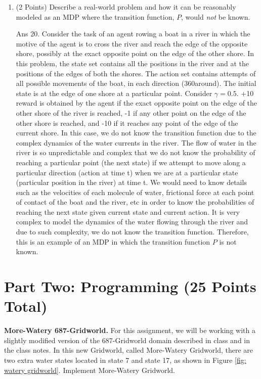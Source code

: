 \documentclass[]{article}
\begin{document}
\begin{enumerate}
{	}
    
    \item (2 Points) Describe a real-world problem and how it can be reasonably modeled as an MDP where the transition function, $P$, would \emph{not} be known.

	{
		\color{blue}
			Ans 20. Consider the task of an agent rowing a boat in a river in which the motive of the agent is to cross the river and reach the edge of the opposite shore, possibly at the exact opposite point on the edge of the other shore. In this  problem, the state set contains all the positions  in the river and at the positions of the edges of both the shores. The action set contains attempts of all possible movements of the boat, in each direction (360\degree around). The initial state is at the edge of one shore at a particular point. Consider $\gamma = 0.5$. +10 reward is obtained by the agent if the exact opposite point on the edge of the other shore of the river is reached, -1 if any other point on the edge of the other shore is reached, and -10 if it reaches any point of the edge of the current shore. In this case, we do not know the transition function due to the complex dynamics of the water currents in the river. The flow of water in the river is so unpredictable and complex  that we do not know the probability of reaching a particular point (the next state)  if we attempt to move along a particular direction (action at time t) when we are at a particular state (particular position in the river) at time t. We would need to know details such as the velocities of each molecule of water, frictional force at each point of contact of the boat and the river, etc in order to know the probabilities of reaching the next state given current state and current action. It  is very complex to model the dynamics of the water flowing through the river and due to such complexity, we do not know the transition function. Therefore, this is an example of an MDP in which the transition function $P$ is not known.
	}
    
\end{enumerate}

\section*{Part Two: Programming (25 Points Total)}

\noindent\textbf{More-Watery 687-Gridworld.} For this assignment, we will be working with a slightly modified version of the 687-Gridworld domain described in class and in the class notes. In this new Gridworld, called More-Watery Gridworld, there are two extra water states located in state 7 and state 17, as shown in Figure \ref{fig: watery gridworld}. Implement More-Watery Gridworld. 
\end{document}
